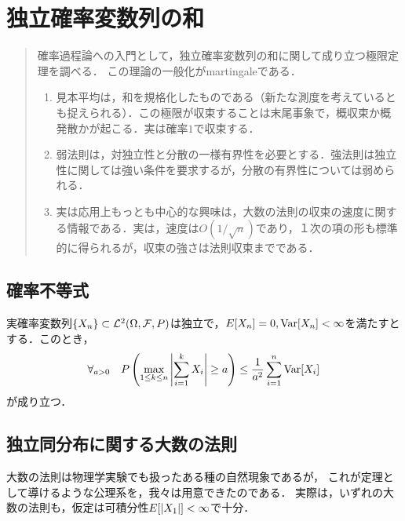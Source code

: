 \documentclass[uplatex,dvipdfmx]{jsreport}
\begin{document}
\chapter{独立確率変数列の和}

\begin{quotation}
    確率過程論への入門として，独立確率変数列の和に関して成り立つ極限定理を調べる．
    この理論の一般化がmartingaleである．
    \begin{enumerate}
        \item 見本平均は，和を規格化したものである（新たな測度を考えているとも捉えられる）．この極限が収束することは末尾事象で，概収束か概発散かが起こる．実は確率$1$で収束する．
        \item 弱法則は，対独立性と分散の一様有界性を必要とする．強法則は独立性に関しては強い条件を要求するが，分散の有界性については弱められる．
        \item 実は応用上もっとも中心的な興味は，大数の法則の収束の速度に関する情報である．実は，速度は$O(1/\sqrt{n})$であり，１次の項の形も標準的に得られるが，収束の強さは法則収束までである．
    \end{enumerate}
\end{quotation}

\section{確率不等式}

\begin{theorem}[Kolmogorov]
    実確率変数列$\{X_n\}\subset\mathcal{L}^2(\Omega,\mathcal{F},P)$は独立で，$E[X_n]=0,\mathrm{Var}[X_n]<\infty$を満たすとする．このとき，
    \[\forall_{a>0}\quad P\left(\max_{1\le k\le n}\left|\sum^k_{i=1}X_i\right|\ge a\right)\le\frac{1}{a^2}\sum^n_{i=1}\mathrm{Var}[X_i]\]
    が成り立つ．
\end{theorem}
\begin{remarks}[martingaleの萌芽]
    
\end{remarks}

\section{独立同分布に関する大数の法則}

\begin{tcolorbox}[colframe=ForestGreen, colback=ForestGreen!10!white,breakable,colbacktitle=ForestGreen!40!white,coltitle=black,fonttitle=\bfseries\sffamily,
title=]
    大数の法則は物理学実験でも扱ったある種の自然現象であるが，
    これが定理として導けるような公理系を，我々は用意できたのである．
    実際は，いずれの大数の法則も，仮定は可積分性$E[\lvert X_1\rvert]<\infty$で十分．
\end{tcolorbox}
\end{document}
